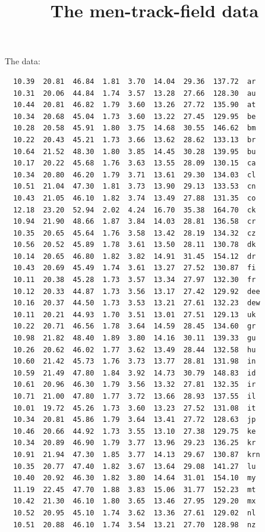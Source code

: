 \documentclass{article}
\title{The men-track-field data}
\begin{document}
\maketitle
The data:
\begin{verbatim}
  10.39  20.81  46.84  1.81  3.70  14.04  29.36  137.72  ar 
  10.31  20.06  44.84  1.74  3.57  13.28  27.66  128.30  au 
  10.44  20.81  46.82  1.79  3.60  13.26  27.72  135.90  at 
  10.34  20.68  45.04  1.73  3.60  13.22  27.45  129.95  be 
  10.28  20.58  45.91  1.80  3.75  14.68  30.55  146.62  bm 
  10.22  20.43  45.21  1.73  3.66  13.62  28.62  133.13  br 
  10.64  21.52  48.30  1.80  3.85  14.45  30.28  139.95  bu 
  10.17  20.22  45.68  1.76  3.63  13.55  28.09  130.15  ca 
  10.34  20.80  46.20  1.79  3.71  13.61  29.30  134.03  cl 
  10.51  21.04  47.30  1.81  3.73  13.90  29.13  133.53  cn 
  10.43  21.05  46.10  1.82  3.74  13.49  27.88  131.35  co 
  12.18  23.20  52.94  2.02  4.24  16.70  35.38  164.70  ck 
  10.94  21.90  48.66  1.87  3.84  14.03  28.81  136.58  cr 
  10.35  20.65  45.64  1.76  3.58  13.42  28.19  134.32  cz 
  10.56  20.52  45.89  1.78  3.61  13.50  28.11  130.78  dk 
  10.14  20.65  46.80  1.82  3.82  14.91  31.45  154.12  dr 
  10.43  20.69  45.49  1.74  3.61  13.27  27.52  130.87  fi 
  10.11  20.38  45.28  1.73  3.57  13.34  27.97  132.30  fr 
  10.12  20.33  44.87  1.73  3.56  13.17  27.42  129.92  dee
  10.16  20.37  44.50  1.73  3.53  13.21  27.61  132.23  dew
  10.11  20.21  44.93  1.70  3.51  13.01  27.51  129.13  uk 
  10.22  20.71  46.56  1.78  3.64  14.59  28.45  134.60  gr 
  10.98  21.82  48.40  1.89  3.80  14.16  30.11  139.33  gu 
  10.26  20.62  46.02  1.77  3.62  13.49  28.44  132.58  hu 
  10.60  21.42  45.73  1.76  3.73  13.77  28.81  131.98  in 
  10.59  21.49  47.80  1.84  3.92  14.73  30.79  148.83  id 
  10.61  20.96  46.30  1.79  3.56  13.32  27.81  132.35  ir 
  10.71  21.00  47.80  1.77  3.72  13.66  28.93  137.55  il 
  10.01  19.72  45.26  1.73  3.60  13.23  27.52  131.08  it 
  10.34  20.81  45.86  1.79  3.64  13.41  27.72  128.63  jp 
  10.46  20.66  44.92  1.73  3.55  13.10  27.38  129.75  ke 
  10.34  20.89  46.90  1.79  3.77  13.96  29.23  136.25  kr 
  10.91  21.94  47.30  1.85  3.77  14.13  29.67  130.87  krn
  10.35  20.77  47.40  1.82  3.67  13.64  29.08  141.27  lu 
  10.40  20.92  46.30  1.82  3.80  14.64  31.01  154.10  my 
  11.19  22.45  47.70  1.88  3.83  15.06  31.77  152.23  mt 
  10.42  21.30  46.10  1.80  3.65  13.46  27.95  129.20  mx 
  10.52  20.95  45.10  1.74  3.62  13.36  27.61  129.02  nl 
  10.51  20.88  46.10  1.74  3.54  13.21  27.70  128.98  nz 

\end{verbatim}
\end{document}

